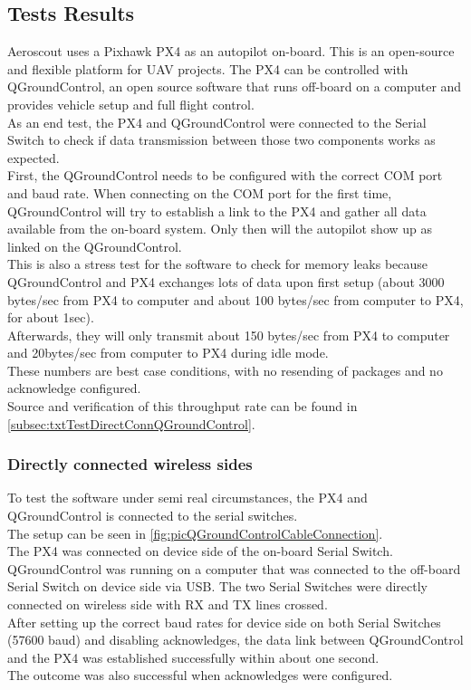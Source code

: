 \subsection{Tests Results} \label{subsec:txtTestResults}
Aeroscout uses a Pixhawk PX4 as an autopilot on-board. This is an open-source and flexible platform for UAV projects. The PX4 can be controlled with QGroundControl, an open source software that runs off-board on a computer and provides vehicle setup and full flight control.\\
As an end test, the PX4 and QGroundControl were connected to the Serial Switch to check if data transmission between those two components works as expected.\\
First, the QGroundControl needs to be configured with the correct COM port and baud rate. When connecting on the COM port for the first time, QGroundControl will try to establish a link to the PX4 and gather all data available from the on-board system. Only then will the autopilot show up as linked on the QGroundControl.\\
This is also a stress test for the software to check for memory leaks because QGroundControl and PX4 exchanges lots of data upon first setup (about 3000 bytes/sec from PX4 to computer and about 100 bytes/sec from computer to PX4, for about 1sec). \\ 
Afterwards, they will only transmit about 150 bytes/sec from PX4 to computer and 20bytes/sec from computer to PX4 during idle mode.\\
These numbers are best case conditions, with no resending of packages and no acknowledge configured.\\
Source and verification of this throughput rate can be found in \autoref{subsec:txtTestDirectConnQGroundControl}.
%
\subsubsection{Directly connected wireless sides}
%
To test the software under semi real circumstances, the PX4 and QGroundControl is connected to the serial switches.\\
The setup can be seen in \autoref{fig:picQGroundControlCableConnection}.\\
The PX4 was connected on device side of the on-board Serial Switch. QGroundControl was running on a computer that was connected to the off-board Serial Switch on device side via USB. The two Serial Switches were directly connected on wireless side with RX and TX lines crossed. \\
After setting up the correct baud rates for device side on both Serial Switches (57600 baud) and disabling acknowledges, the data link between QGroundControl and the PX4 was established successfully within about one second.\\
The outcome was also successful when acknowledges were configured.
%
